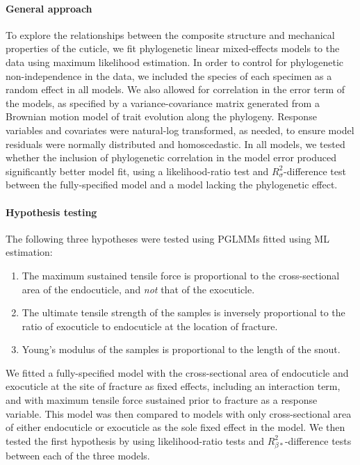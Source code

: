 \documentclass[twocolumn, linenumbers, superscriptaddress, nofootinbib]{revtex4-1}
\begin{document}
			\paragraph*{General approach}
				To explore the relationships between the composite structure and mechanical properties of the cuticle, we fit phylogenetic linear mixed-effects models to the data using maximum likelihood estimation.
				In order to control for phylogenetic non-independence in the data, we included the species of each specimen as a random effect in all models.
				We also allowed for correlation in the error term of the models, as specified by a variance-covariance matrix generated from a Brownian motion model of trait evolution along the phylogeny.
				Response variables and covariates were natural-log transformed, as needed, to ensure model residuals were normally distributed and homoscedastic.
				In all models, we tested whether the inclusion of phylogenetic correlation in the model error produced significantly better model fit, using a likelihood-ratio test and $R^{2}_{\sigma}$-difference test between the fully-specified model and a model lacking the phylogenetic effect.
				
			\paragraph*{Hypothesis testing}
				The following three hypotheses were tested using PGLMMs fitted using ML estimation:
				\begin{enumerate}
				\item The maximum sustained tensile force is proportional to the cross-sectional area of the endocuticle, and \emph{not} that of the exocuticle.
				\item The ultimate tensile strength of the samples is inversely proportional to the ratio of exocuticle to endocuticle at the location of fracture.
				\item Young's modulus of the samples is proportional to the length of the snout.
				\end{enumerate}
				
				We fitted a fully-specified model with the cross-sectional area of endocuticle and exocuticle at the site of fracture as fixed effects, including an interaction term, and with maximum tensile force sustained prior to fracture as a response variable.
				This model was then compared to models with only cross-sectional area of either endocuticle or exocuticle as the sole fixed effect in the model.
				We then tested the first hypothesis by using likelihood-ratio tests and $R^{2}_{\beta*}$-difference tests between each of the three models.
				
\end{document}
